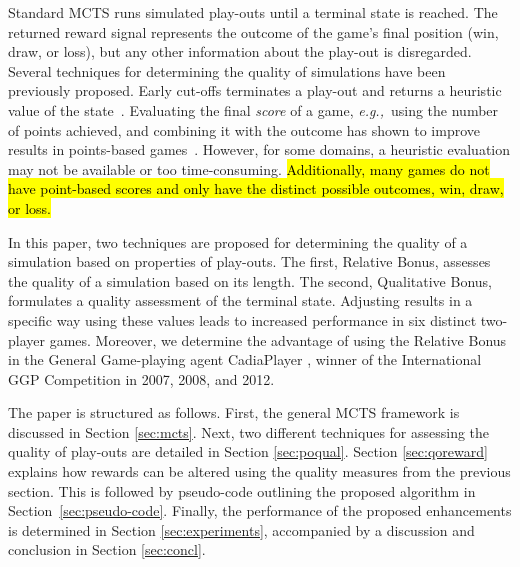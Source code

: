 \documentclass{ecai2014}
\newcommand{\eg}{{\it e.g.,}~}
\begin{document}
Standard MCTS runs simulated play-outs until a terminal state is reached. The returned reward signal represents the outcome of the game's final position (win, draw, or loss), but any other information about the play-out is disregarded. 
Several techniques for determining the quality of simulations have been previously proposed. Early cut-offs terminates a play-out and returns a heuristic value of the state~\cite{Winands2011}. Evaluating the final \emph{score} of a game, \eg using the number of points achieved, and combining it with the outcome  has shown to improve results in points-based games~\cite{shibahara2008combining}. However, for some domains, a heuristic evaluation may not be available or too time-consuming. \hl{Additionally, many games do not have point-based scores and only have the distinct possible outcomes, win, draw, or loss.}

In this paper, two techniques are proposed for determining the quality of a simulation based on properties of play-outs. The first, Relative Bonus, assesses the quality of a simulation based on its length. The second, Qualitative Bonus, formulates a quality assessment of the terminal state. Adjusting results in a specific way using these values leads to increased performance in six distinct two-player games. Moreover, we determine the advantage of using the Relative Bonus in the General Game-playing agent {\sc CadiaPlayer} \cite{bjornsson2009cadiaplayer}, winner of the International GGP Competition in 2007, 2008, and 2012.

The paper is structured as follows. First, the general MCTS framework is discussed in Section \ref{sec:mcts}. Next, two different techniques for assessing the quality of play-outs are detailed in Section \ref{sec:poqual}. Section \ref{sec:qoreward} explains how rewards can be altered using the quality measures from the previous section. This is followed by pseudo-code outlining the proposed algorithm in Section~\ref{sec:pseudo-code}. Finally, the performance of the proposed enhancements is determined in Section \ref{sec:experiments}, accompanied by a discussion and conclusion in Section \ref{sec:concl}.

\end{document}
